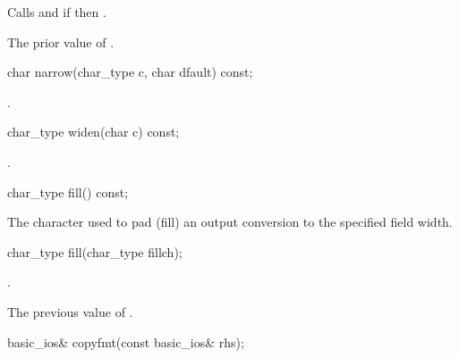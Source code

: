 \begin{itemdescr}
\pnum
\effects
Calls
and
if
then
.

\pnum
\returns
The prior value of
.
\end{itemdescr}

%
\begin{itemdecl}
char narrow(char_type c, char dfault) const;
\end{itemdecl}

\begin{itemdescr}
\pnum
\returns
{}.
\end{itemdescr}

%
\begin{itemdecl}
char_type widen(char c) const;
\end{itemdecl}

\begin{itemdescr}
\pnum
\returns
{}.
\end{itemdescr}

%
\begin{itemdecl}
char_type fill() const;
\end{itemdecl}

\begin{itemdescr}
\pnum
\returns
The character used to pad (fill) an output conversion to the specified
field width.
\end{itemdescr}

%
\begin{itemdecl}
char_type fill(char_type fillch);
\end{itemdecl}

\begin{itemdescr}
\pnum
\ensures
{}.

\pnum
\returns
The previous value of
.
\end{itemdescr}

%
\begin{itemdecl}
basic_ios& copyfmt(const basic_ios& rhs);
\end{itemdecl}

